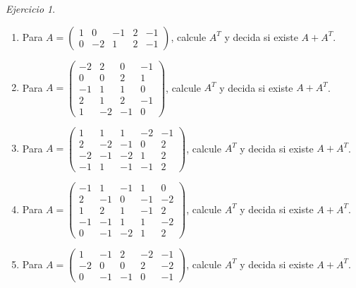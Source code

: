 \documentclass[12pt]{article}
\theoremstyle{remark}
\newtheorem{Ejer}[definicion]{Ejercicio}
\begin{document}
\begin{Ejer}
\begin{enumerate}[resume=banco]
\item Para $A=\begin{pmatrix}1&0&-1&2&-1\\0&-2&1&2&-1\end{pmatrix}$, calcule $A^T$ y decida si existe $A+A^T$.

\item Para $A=\begin{pmatrix}-2&2&0&-1\\0&0&2&1\\-1&1&1&0\\2&1&2&-1\\1&-2&-1&0\end{pmatrix}$, calcule $A^T$ y decida si existe $A+A^T$.

\item Para $A=\begin{pmatrix}1&1&1&-2&-1\\2&-2&-1&0&2\\-2&-1&-2&1&2\\-1&1&-1&-1&2\end{pmatrix}$, calcule $A^T$ y decida si existe $A+A^T$.

\item Para $A=\begin{pmatrix}-1&1&-1&1&0\\2&-1&0&-1&-2\\1&2&1&-1&2\\-1&-1&1&1&-2\\0&-1&-2&1&2\end{pmatrix}$, calcule $A^T$ y decida si existe $A+A^T$.

\item Para $A=\begin{pmatrix}1&-1&2&-2&-1\\-2&0&0&2&-2\\0&-1&-1&0&-1\end{pmatrix}$, calcule $A^T$ y decida si existe $A+A^T$.

\end{enumerate}
\end{Ejer}
\end{document}
